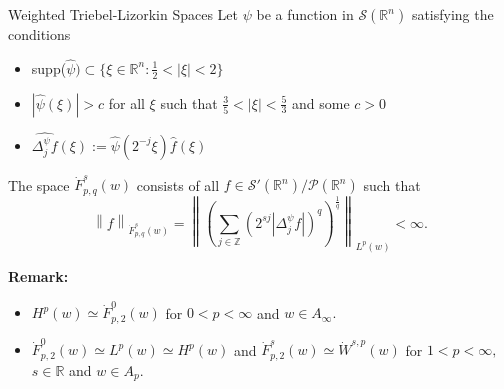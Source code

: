 \documentclass[xcolor=dvipsnames]{beamer}
\newcommand{\re}{\mathbb{R}}
\newcommand{\rn}{{{\mathbb R}^n}}
\newcommand{\ent}{\mathbb{Z}}
\newcommand{\fr}[2]{{\textstyle \frac{#1}{#2}}}
\newcommand{\norm}[2]{{\left\| #1 \right\|}_{#2}}
\newcommand{\sw}{{\mathcal{S}}(\rn)}
\newcommand{\swp}{{\mathcal{S}'}(\rn)}
\newcommand{\N}{\mathbb N}
\newcommand{\tlw}[4]{\dot F_{#1,#3}^{#2}(#4)} %
\newcommand{\lebw}[2]{L^{#1}(#2)} %
\begin{document}
%
%
%
%
%

\begin{frame}{Weighted Triebel-Lizorkin Spaces}
Let $\psi$ be a function in $\sw$ satisfying the conditions
\begin{itemize}
\item supp($\widehat{\psi})\subset \{\xi \in \rn :\fr{1}{2} < |\xi| < 2 \}$
\item $|\widehat{\psi}(\xi)| > c$ for all $\xi$ such that $\fr{3}{5}<|\xi|<\fr{5}{3}$ and some $c>0$
\item $\widehat{\Delta^\psi_j f}(\xi) := \widehat{\psi}(2^{-j}\xi)\widehat{f}(\xi)$
\end{itemize}
\bigskip
The space $\tlw{p}{s}{q}{w}$ consists of all $f\in \swp/\mathcal{P}(\rn)$ such that 
\begin{equation*}
\norm{f}{\tlw{p}{s}{q}{w}}=\norm{\left(\sum_{j\in\ent}(2^{sj}|\Delta^\psi_jf|)^q\right)^{\frac{1}{q}}}{\lebw{p}{w}}<\infty.
\end{equation*}


 {\bf Remark:} 
 \begin{itemize}
  \item $H^p(w)\simeq\tlw{p}{0}{2}{w}$  for $0<p<\infty$ and $w\in A_\infty.$ 
 \item $\tlw{p}{0}{2}{w}\simeq L^p(w)\simeq H^p(w)$ and $\tlw{p}{s}{2}{w}\simeq \dot{W}^{s,p}(w)$ for $1<p<\infty,$ $s\in\re$ and $w\in A_p.$  
\end{itemize}


\end{frame}
\end{document}
